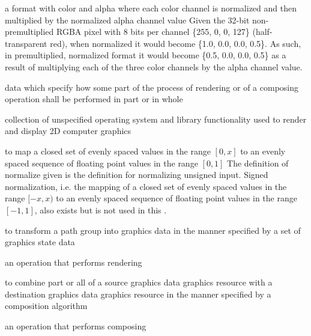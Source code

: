 a format with color and alpha where each color channel is normalized and then 
multiplied by the normalized alpha channel value
\enterexample
Given the 32-bit non-premultiplied RGBA pixel with 8 bits per channel \{255, 0, 
0, 127\} (half-transparent red), when normalized it would become \{1.0, 0.0, 
0.0, 0.5\}. As such, in premultiplied, normalized format it would become \{0.5, 
0.0, 0.0, 0.5\} as a result of multiplying each of the three color channels by 
the alpha channel value.
\exitexample

data which specify how some part of the process of rendering or of a composing operation shall be performed in part or in whole

collection of unspecified operating system and library functionality used to render and display 2D computer graphics

to map a closed set of evenly spaced values in the range $[0, x]$ to an evenly spaced sequence of floating point values in the range $[0, 1]$
\enternote
The definition of normalize given is the definition for normalizing unsigned input. Signed normalization, i.e. the mapping of a closed set of evenly spaced values in the range $[-x, x)$ to an evenly spaced sequence of floating point values in the range $[-1, 1]$, also exists but is not used in this \documenttypename{}.
\exitnote

to transform a path group into graphics data in the manner specified by a set of graphics state data

an operation that performs rendering

to combine part or all of a source graphics data graphics resource with a destination graphics data graphics resource in the manner specified by a composition algorithm

an operation that performs composing

